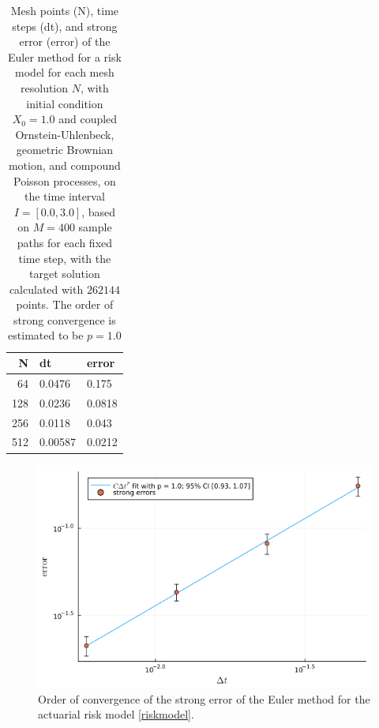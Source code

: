 \documentclass[reqno,12pt]{amsart}
\theoremstyle{plain} %
\theoremstyle{definition} %
\begin{document}
\begin{table}
    \begin{tabular}[htb]{|r|l|l|}
        \hline N & dt & error\\
        \hline \hline
        64 & 0.0476 & 0.175 \\
        128 & 0.0236 & 0.0818 \\
        256 & 0.0118 & 0.043 \\
        512 & 0.00587 & 0.0212 \\
        \hline
    \end{tabular}
    \bigskip

    \caption{Mesh points (N), time steps (dt), and strong error (error) of the Euler method for a risk model for each mesh resolution $N$, with initial condition $X_0 = 1.0$ and coupled Ornstein-Uhlenbeck, geometric Brownian motion, and compound Poisson processes, on the time interval $I = [0.0, 3.0]$, based on $M = 400$ sample paths for each fixed time step, with the target solution calculated with $262144$ points. The order of strong convergence is estimated to be $p = 1.0$}
    \label{tableriskmodel}
\end{table}

\begin{figure}[htb]
    \includegraphics[scale=0.6]{img/convergence_riskmodel.png}
    \caption{Order of convergence of the strong error of the Euler method for the actuarial risk model \eqref{riskmodel}.}
    \label{figriskmodel}
\end{figure}
\end{document}
